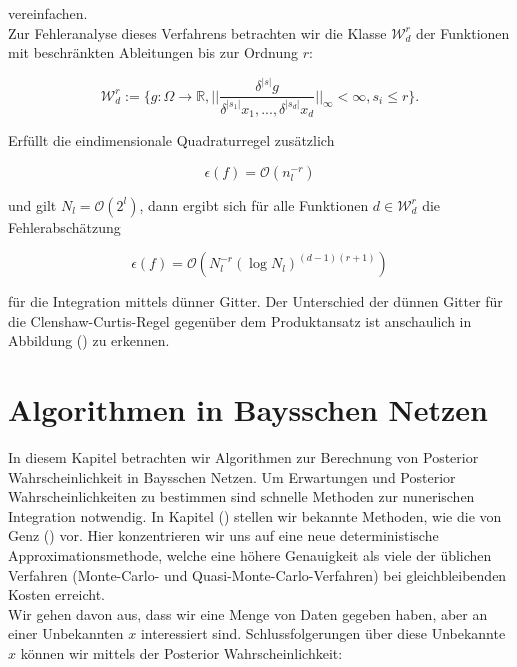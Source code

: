 \documentclass[12pt,a4paper]{scrartcl}
\numberwithin{equation}{section}
\newcommand{\R}{\mathbb{R}} %
\begin{document}
{  vereinfachen. \\
  
  Zur Fehleranalyse dieses Verfahrens betrachten wir die Klasse $\mathcal{W}_d^r$ der Funktionen mit beschränkten
  Ableitungen bis zur Ordnung $r$:
  
  \begin{equation}
   \mathcal{W}_d^r := \{g: \Omega \rightarrow \R, ||\frac{\delta^{|s|}g}{\delta^{|s_1|} x_1,...,\delta^{|s_d|} x_d}||_{\infty} < \infty, s_i \leq r\}.
  \end{equation}
  
  Erfüllt die eindimensionale Quadraturregel zusätzlich 
  
  \begin{equation}
   \epsilon(f) = \mathcal{O}(n_l^{-r})
  \end{equation}

  und gilt $N_l = \mathcal{O}(2^l)$, dann ergibt sich für alle Funktionen $d \in \mathcal{W}_d^r$
  die Fehlerabschätzung
  
  \begin{equation}
   \epsilon(f) = \mathcal{O}(N_l^{-r}(\log N_l)^{(d-1)(r+1)})
  \end{equation}

  für die Integration mittels dünner Gitter. Der Unterschied der dünnen Gitter für die Clenshaw-Curtis-Regel
  gegenüber dem Produktansatz ist anschaulich in Abbildung () zu erkennen.
  
  \section{Algorithmen in Baysschen Netzen}
  
  In diesem Kapitel betrachten wir Algorithmen zur Berechnung von Posterior Wahrscheinlichkeit in Baysschen Netzen.
  Um Erwartungen und Posterior Wahrscheinlichkeiten zu bestimmen sind schnelle Methoden zur nunerischen Integration notwendig. 
  In Kapitel () stellen wir bekannte Methoden, wie die von Genz () vor. Hier konzentrieren wir uns auf eine neue deterministische
  Approximationsmethode, welche eine höhere Genauigkeit als viele der üblichen Verfahren (Monte-Carlo- und Quasi-Monte-Carlo-Verfahren) bei gleichbleibenden Kosten 
  erreicht. \\
  Wir gehen davon aus, dass wir eine Menge von Daten gegeben haben, aber an einer Unbekannten $x$ interessiert sind.
  Schlussfolgerungen über diese Unbekannte $x$ können wir mittels der Posterior Wahrscheinlichkeit: 
  
}
\end{document}
